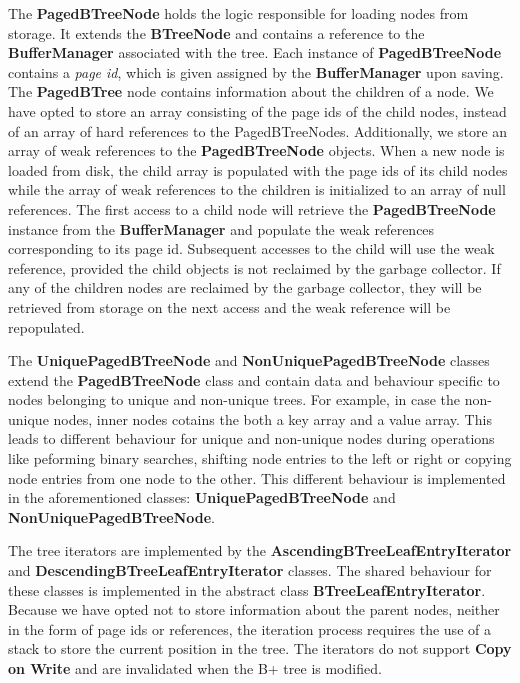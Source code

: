 \documentclass[11pt,a4paper,oneside]{article}
\begin{document}
The \textbf{PagedBTreeNode} holds the logic responsible for loading nodes from storage. It extends the \textbf{BTreeNode} and contains a reference to the \textbf{BufferManager} associated with the tree. Each instance of \textbf{PagedBTreeNode} contains a \textit{page id}, which is given assigned by the \textbf{BufferManager} upon saving. The \textbf{PagedBTree} node contains information about the children of a node. We have opted to store an array consisting of the page ids of the child nodes, instead of an array of hard references to the PagedBTreeNodes. Additionally, we store an array of weak references to the \textbf{PagedBTreeNode} objects. When a new node is loaded from disk, the child array is populated with the page ids of its child nodes while the array of weak references to the children is initialized to an array of null references. The first access to a child node will retrieve the \textbf{PagedBTreeNode} instance from the \textbf{BufferManager} and populate the weak references corresponding to its page id. Subsequent accesses to the child will use the weak reference, provided the child objects is not reclaimed by the garbage collector. If any of the children nodes are reclaimed by the garbage collector, they will be retrieved from storage on the next access and the weak reference will be repopulated.

The \textbf{UniquePagedBTreeNode} and \textbf{NonUniquePagedBTreeNode} classes extend the \textbf{PagedBTreeNode} class and contain data and behaviour specific to nodes belonging to unique and non-unique trees. For example, in case the non-unique nodes, inner nodes cotains the both a key array and a value array. This leads to different behaviour for unique and non-unique nodes during operations like peforming binary searches, shifting node entries to the left or right or copying node entries from one node to the other. This different behaviour is implemented in the aforementioned classes: \textbf{UniquePagedBTreeNode} and \textbf{NonUniquePagedBTreeNode}. 

The tree iterators are implemented by the \textbf{AscendingBTreeLeafEntryIterator} and \textbf{DescendingBTreeLeafEntryIterator} classes. The shared behaviour for these classes is implemented in the abstract class \textbf{BTreeLeafEntryIterator}. Because we have opted not to store information about the parent nodes, neither in the form of page ids or references, the iteration process requires the use of a stack to store the current position in the tree. The iterators do not support \textbf{Copy on Write} and are invalidated when the B+ tree is modified. 
\end{document}
